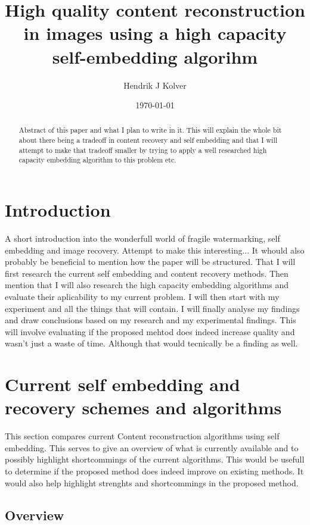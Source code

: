 \documentclass[a4paper]{article}
\title{High quality content reconstruction in images using a high capacity self-embedding algorihm}
\author{Hendrik J Kolver}
\date{\today}
\begin{document}
\maketitle

\begin{abstract}

\noindent Abstract of this paper and what I plan to write in it.
This will explain the whole bit about there being a tradeoff in content recovery and self embedding and that I will attempt to make that tradeoff smaller by trying to apply a well researched high capacity embedding algorithm to this problem etc.

\end{abstract}

\section{Introduction}
A short introduction into the wonderfull world of fragile watermarking, self embedding and image recovery. Attempt to make this interesting...
It whould also probably be beneficial to mention how the paper will be structured. 
That I will first research the current self embedding and content recovery methods. 
Then mention that I will also research the high capacity embedding algorithms and evaluate their aplicability to my current problem. 
I will then start with my experiment and all the things that will contain. 
I will finally analyse my findings and draw conclusions based on my research and my experimental findings. 
This will involve evaluating if the proposed mehtod does indeed increase quality and wasn't just a waste of time. 
Although that would tecnically be a finding as well. 

\section{Current self embedding and recovery schemes and algorithms}

This section compares current Content reconstruction algorithms using self embedding.
This serves to give an overview of what is currently available and to possibly highlight shortcommings of the current algorithms.
This would be usefull to determine if the proposed method does indeed improve on existing methods. 
It would also help highlight strenghts and shortcommings in the proposed method.

\subsection{Overview}
\end{document}
